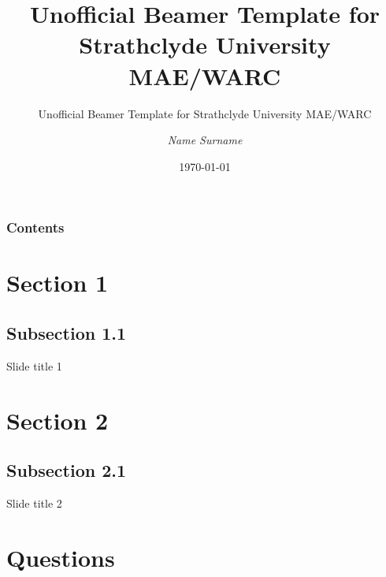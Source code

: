 \documentclass{beamer}
\author{\textit{Name Surname}}
\title[UoS MAE/WARC Beamer Template]{Unofficial Beamer Template for Strathclyde University MAE/WARC}
\subtitle{Unofficial Beamer Template for Strathclyde University MAE/WARC}
\date{\today}
\begin{document}
\begin{frame}
\titlepage
\end{frame}

\begin{frame}
	\frametitle{Contents}
	\tableofcontents
\end{frame}

\section{Section 1}
\subsection{Subsection 1.1}
\begin{frame}{Slide title 1}
\lipsum[1]
\end{frame}

\section{Section 2}
\subsection{Subsection 2.1}
\begin{frame}{Slide title 2}
\lipsum[2]
\end{frame}

\section{Questions}
\end{document}
